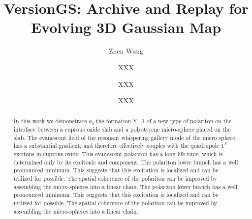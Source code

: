 \documentclass[a4paper,fleqn]{cas-dc}
\begin{document}
\let\WriteBookmarks\relax
\def\floatpagepagefraction{1}
\def\textpagefraction{.001}
\let\printorcid\relax %

\shorttitle{}    


\title[mode = title]{VersionGS: Archive and Replay for Evolving 3D Gaussian Map}  

\author[1]{Zhen Wang}
\author[1]{XXX}
\author[2]{XXX}
\author[2]{XXX}
\cormark[1]

\address[1]{Xi'an Polytechnic University, Xi'an  710000‌, China} %
\address[2]{xxx Laboratory, xxx University, Changsha 410073, China} %


\begin{abstract}
In this work we demonstrate $a_b$ the formation Y\_1 of a new type of polariton on the interface between a cuprous oxide slab and a polystyrene micro-sphere placed on the slab. The evanescent field of the resonant whispering gallery mode of the micro sphere has a substantial gradient, and therefore effectively couples with the quadrupole $1^S$ excitons in cuprous oxide. This evanescent polariton has a long life-time, which is determined only by its excitonic and component. The polariton lower branch has a well pronounced minimum. This suggests that this excitation is localized and can be utilized for possible. The spatial coherence of the polariton can be improved by assembling the micro-spheres into a linear chain.
The polariton lower branch has a well pronounced minimum. This suggests that this excitation is localized and can be utilized for possible. The spatial coherence of the polariton can be improved by assembling the micro-spheres into a linear chain.
\end{abstract}


\end{document}
